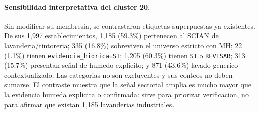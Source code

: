 \documentclass[11pt,letterpaper]{article}
\begin{document}
\paragraph{Sensibilidad interpretativa del cluster 20.} Sin modificar su membresia, se contrastaron etiquetas superpuestas ya existentes. De sus 1,997 establecimientos, 1,185 (59.3\%) pertenecen al SCIAN de lavanderia/tintoreria; 335 (16.8\%) sobreviven el universo estricto con MH; 22 (1.1\%) tienen \texttt{evidencia\_hidrica=SI}; 1,205 (60.3\%) tienen \texttt{SI} o \texttt{REVISAR}; 313 (15.7\%) presentan señal de humedo explicito; y 871 (43.6\%) lavado generico contextualizado. Las categorias no son excluyentes y sus conteos no deben sumarse. El contraste muestra que la señal sectorial amplia es mucho mayor que la evidencia humeda explicita o confirmada: sirve para priorizar verificacion, no para afirmar que existan 1,185 lavanderias industriales.
\end{document}
